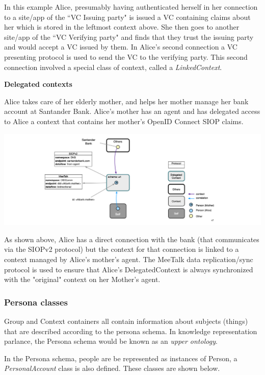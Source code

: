 \documentclass[11pt, oneside]{article}   	%
\begin{document}
In this example Alice, presumably having authenticated herself in her connection to a site/app of the ``VC Issuing party" is issued a VC containing claims about her which is stored in the leftmost context above. She then goes to another site/app of the ``VC Verifying party" and finds that they trust the issuing party and would accept a VC issued by them. In Alice's second connection a VC presenting protocol is used to send the VC to the verifying party. This second connection involved a special class of context, called a \emph{LinkedContext}. 

\textbf{Delegated contexts}

Alice takes care of her elderly mother, and helps her mother manage her bank account at Santander Bank. Alice's mother has an agent and has delegated access to Alice a context that contains her mother's OpenID Connect SIOP claims. 

\includegraphics[width=\textwidth]{./images/delegated-contexts.png}

As shown above, Alice has a direct connection with the bank (that communicates via the SIOPv2 protocol) but the context for that connection is linked to a context managed by Alice's mother's agent. The MeeTalk data replication/sync protocol is used to ensure that Alice's DelegatedContext is always synchronized with the "original" context on her Mother's agent.

\subsubsection{Persona classes}

Group and Context containers all contain information about subjects (things) that are described according to the persona schema. In knowledge representation parlance, the Persona schema would be known as an \emph{upper ontology}.

In the Persona schema, people are be represented as instances of Person, a \emph{PersonalAccount} class is also defined. These classes are shown below. 
\end{document}
